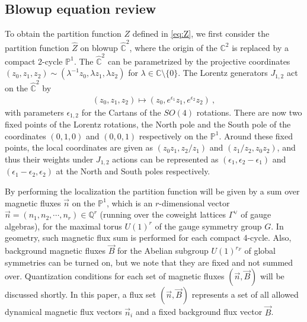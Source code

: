 \subsection{Blowup equation review}\label{sec:BlowupEqReview}

To obtain the partition function $Z$ defined in \eqref{eq:Z}, we first consider the partition function $\hat{Z}$ on blowup $\hat{\mathbb{C}}^2$, where the origin of the $\mathbb{C}^2$ is replaced by a compact 2-cycle $\mathbb{P}^1$. The $\hat{\mathbb{C}}^2$ can be parametrized by the projective coordinates $(z_0,z_1,z_2)\sim(\lambda^{-1}z_0,\lambda z_1,\lambda z_2)$ for $\lambda\in\mathbb{C}\setminus\{0\}$. The Lorentz generators $J_{1,2}$ act on the $\hat{\mathbb{C}}^2$ by 
\begin{align}
(z_0,z_1,z_2)\mapsto(z_0,e^{\epsilon_1}z_1,e^{\epsilon_2}z_2)\ ,
\end{align}
with parameters $\epsilon_{1,2}$ for the Cartans of the $SO(4)$ rotations. There are now two fixed points of the Lorentz rotations, the North pole and the South pole of the coordinates $(0,1,0)$ and $(0,0,1)$ respectively on the $\mathbb{P}^1$. Around these fixed points, the local coordinates are given as $(z_0z_1,z_2/z_1)$ and $(z_1/z_2, z_0z_2)$, and thus their weights under $J_{1,2}$ actions can be represented as $(\epsilon_1,\epsilon_2-\epsilon_1)$ and $(\epsilon_1-\epsilon_2,\epsilon_2)$ at the North and South poles respectively. 

By performing the localization the partition function will be given by a sum over magnetic fluxes $\vec{n}$ on the $\mathbb{P}^1$, which is an $r$-dimensional vector $\vec{n}=(n_1,n_2,\cdots,n_r)\in \mathbb{Q}^r$ (running over the coweight lattices $\Gamma^\vee$ of gauge algebras), for the maximal torus $U(1)^r$ of the gauge symmetry group $G$. In geometry, such magnetic flux sum is performed for each compact 4-cycle. Also, background magnetic fluxes $\vec{B}$ for the Abelian subgroup $U(1)^{r_F}$ of global symmetries can be turned on, but we note that they are fixed and not summed over. Quantization conditions for each set of magnetic fluxes $(\vec{n},\vec{B})$ will be discussed shortly. In this paper, a flux set $(\vec{n},\vec{B})$ represents a set of all allowed dynamical magnetic flux vectors $\vec{n}_i$ and a fixed background flux vector $\vec{B}$.

